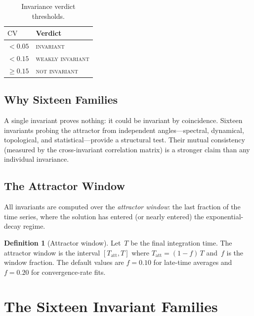\documentclass[11pt,twoside,openright]{book}
\theoremstyle{definition}
\newtheorem{definition}{Definition}[chapter]
\theoremstyle{plain}
\theoremstyle{definition}
\theoremstyle{remark}
\newcommand{\att}{\mathrm{att}}
\newcommand{\CV}{\mathrm{CV}}
\begin{document}
\begin{table}[h]
\centering
\caption{Invariance verdict thresholds.}\label{tab:cv-thresholds}
\begin{tabular}{@{}ll@{}}
\toprule
\(\CV\) & Verdict \\
\midrule
\(< 0.05\) & \textsc{invariant} \\
\(< 0.15\) & \textsc{weakly invariant} \\
\(\geq 0.15\) & \textsc{not invariant} \\
\bottomrule
\end{tabular}
\end{table}

\section{Why Sixteen Families}\label{sec:sixteen}

A single invariant proves nothing: it could be invariant by coincidence. Sixteen invariants probing the attractor from independent angles---spectral, dynamical, topological, and statistical---provide a structural test. Their mutual consistency (measured by the cross-invariant correlation matrix) is a stronger claim than any individual invariance.

\section{The Attractor Window}\label{sec:attractor-window}

All invariants are computed over the \emph{attractor window}: the last fraction of the time series, where the solution has entered (or nearly entered) the exponential-decay regime.

\begin{definition}[Attractor window]\label{def:attractor-window}
Let~\(T\) be the final integration time. The attractor window is the interval \([T_\att, T]\) where \(T_\att = (1-f)\,T\) and~\(f\) is the window fraction. The default values are \(f = 0.10\) for late-time averages and \(f = 0.20\) for convergence-rate fits.
\end{definition}


\chapter{The Sixteen Invariant Families}\label{ch:families}
\end{document}
